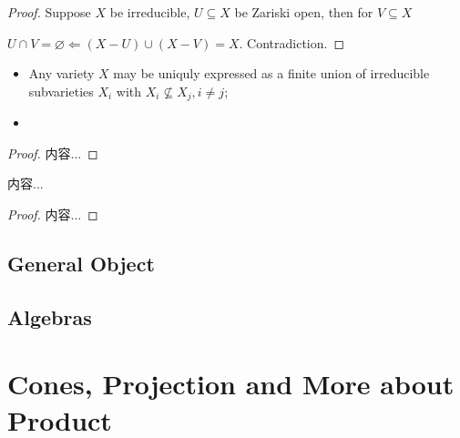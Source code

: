 \documentclass[Total.tex]{subfiles}
\begin{document}
		\begin{proof}
			Suppose $X$ be irreducible, $U\subseteq X$ be Zariski open, then for $V\subseteq X$
			
			$U\cap V=\varnothing\Leftarrow (X-U)\cup (X-V)=X$. Contradiction.
			
		\end{proof}
		
		\begin{proposition}
			\begin{itemize}
				\item Any variety $X$ may be uniquly expressed as a finite union of irreducible subvarieties $X_i$ with $X_i\not\subseteq X_j,i\not=j$;
				\item 
			\end{itemize}
		\end{proposition}
		
		\begin{proof}
			内容...
		\end{proof}
		
		\begin{theorem}
			内容...
		\end{theorem}
		
		\begin{proof}
			内容...
		\end{proof}
		
		\subsection{General Object}
		
		\subsection{Algebras}
		
		\section{Cones, Projection and More about Product}
		
\end{document}
